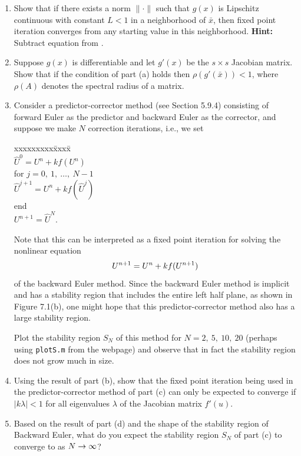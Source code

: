 \documentclass[10pt]{article}
\begin{document}
\begin{enumerate}
\item Show that if there exists a norm $\|\cdot\|$ such that $g(x)$ is
Lipschitz continuous with constant $L<1$ in a neighborhood of $\bar x$, then
fixed point iteration converges from any starting value in this
neighborhood.
{\bf Hint:} Subtract equation  from .

\item Suppose $g(x)$ is differentiable and let $g'(x)$ be the $s\times s$
Jacobian matrix.  Show that if the condition of part (a) holds then
$\rho(g'(\bar x)) < 1$, where $\rho(A)$ denotes the spectral radius of a
matrix.

\item Consider a predictor-corrector method (see Section 5.9.4) consisting
of forward Euler as the predictor and backward Euler as the corrector, and
suppose we make $N$ correction iterations, i.e., we set
\begin{tabbing}
xxxxxxxxx\=xxxx\=\kill\\
\>$\hat U^0 = U^n + kf(U^n)$\\
\>for $j = 0,~1,~\ldots,~N-1$\\
\>\>$\hat U^{j+1} = U^n + kf(\hat U^j)$\\
\>\>end\\
\>$U^{n+1} = \hat U^N$.
\end{tabbing}
Note that this can be interpreted as a fixed point iteration for solving the
nonlinear equation
\[
U^{n+1} = U^n + kf(U^{n+1})
\]
of the backward Euler method.  Since the backward Euler method is implicit
and has a stability region that includes the entire left half plane, as
shown in Figure 7.1(b), one might hope that this predictor-corrector method
also has a large stability region.

Plot the stability region $S_N$
of this method for $N=2,~5,~10,~20$ (perhaps using
{\tt plotS.m} from the webpage) and observe that in fact the stability
region does not grow much in size.

\item Using the result of part (b), show that the fixed point iteration
being used in the predictor-corrector method of part (c) can only be
expected to converge if $|k\lambda| < 1$ for all eigenvalues $\lambda$ of the
Jacobian matrix $f'(u)$.  

\item Based on the result of part (d) and the shape of the stability region
of Backward Euler, what do you expect the stability region $S_N$ of part (c)
to converge to as $N\rightarrow\infty$?

\end{enumerate}
\end{document}
